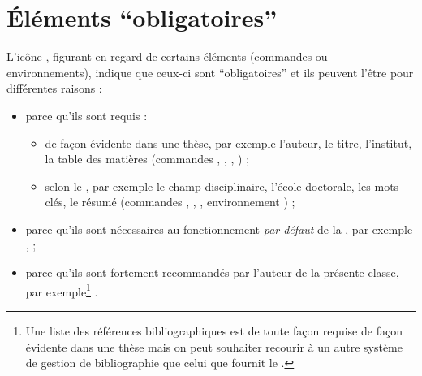 \section{Éléments \enquote{obligatoires}}
\label{sec:comm-oblig}

L'icône \mandatory{}, figurant en regard de certains éléments (commandes ou
environnements), indique que ceux-ci sont \enquote{obligatoires} et ils peuvent
l'être pour différentes raisons :
\begin{itemize}
\item parce qu'ils sont requis :
  \begin{itemize}
  \item de façon évidente dans une thèse, par exemple l'auteur, le titre,
    l'institut, la table des matières (commandes ,
    , , ) ;
  \item selon le \textcite{guidoct}, par exemple le champ disciplinaire,
    l'école doctorale, les mots clés, le résumé (commandes
    , , ,
    environnement ) ;
  \end{itemize}
\item parce qu'ils sont nécessaires au fonctionnement \emph{par défaut} de la
  \yatcl{}, par exemple ,  ;
\item parce qu'ils sont fortement recommandés par l'auteur de la présente
  classe, par exemple\footnote{Une liste des références bibliographiques est de
    toute façon requise de façon évidente dans une thèse mais on peut souhaiter
    recourir à un autre système de gestion de bibliographie que celui que
    fournit le .}  .
\end{itemize}

